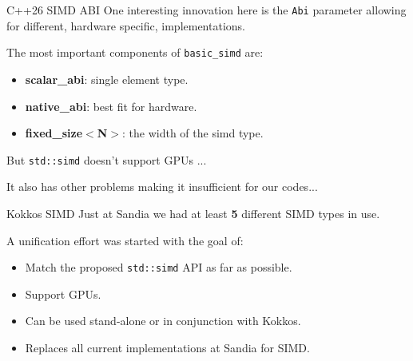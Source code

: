\begin{frame}[fragile]{C++26 SIMD ABI}
One interesting innovation here is the \texttt{Abi} parameter allowing for different, hardware specific, implementations.

	\vspace{8pt}

The most important components of \texttt{basic\_simd} are:
\begin{itemize}
	\item{\textbf{scalar\_abi}: single element type.}
	\item{\textbf{native\_abi}: best fit for hardware.}
	\item{\textbf{fixed\_size$<$N$>$}: the width of the simd type.}
\end{itemize}

\pause
	\vspace{8pt}

	But \texttt{std::simd} doesn't support GPUs ...

	\pause
	\vspace{8pt}
	It also has other problems making it insufficient for our codes...
\end{frame}

\begin{frame}[fragile]{Kokkos SIMD}
   Just at Sandia we had at least \textbf{5} different SIMD types in use.

   \vspace{8pt}
   A unification effort was started with the goal of:
   \begin{itemize}
      \item{Match the proposed \texttt{std::simd} API as far as possible.}
      \item{Support GPUs.}
      \item{Can be used stand-alone or in conjunction with Kokkos.}
      \item{Replaces all current implementations at Sandia for SIMD.}
   \end{itemize}

\end{frame}


